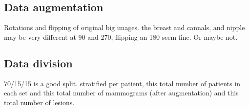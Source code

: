 	\subsection{Data augmentation}
	Rotations and flipping of original big images. the breast and cannals, and nipple may be very different at 90 and 270, flipping an 180 seem fine. Or maybe not.


	\subsection{Data division}
	70/15/15 is a good split. stratified per patient, this total number of patients in each set and this total number of mammograms (after augmentation) and this total number of lesions.
